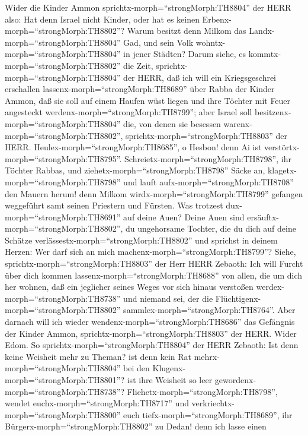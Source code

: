  Wider die Kinder Ammon
sprichtx-morph=``strongMorph:TH8804'' der HERR also: Hat denn Israel
nicht Kinder, oder hat es keinen Erbenx-morph=``strongMorph:TH8802''?
Warum besitzt denn Milkom das Landx-morph=``strongMorph:TH8804'' Gad,
und sein Volk wohntx-morph=``strongMorph:TH8804'' in jener Städten?
 Darum siehe, es kommtx-morph=``strongMorph:TH8802'' die
Zeit, sprichtx-morph=``strongMorph:TH8804'' der HERR, daß ich will ein
Kriegsgeschrei erschallen lassenx-morph=``strongMorph:TH8689'' über
Rabba der Kinder Ammon, daß sie soll auf einem Haufen wüst liegen und
ihre Töchter mit Feuer angesteckt werdenx-morph=``strongMorph:TH8799'';
aber Israel soll besitzenx-morph=``strongMorph:TH8804'' die, von denen
sie besessen warenx-morph=``strongMorph:TH8802'',
sprichtx-morph=``strongMorph:TH8803'' der HERR. 
Heulex-morph=``strongMorph:TH8685'', o Hesbon! denn Ai ist
verstörtx-morph=``strongMorph:TH8795''.
Schreietx-morph=``strongMorph:TH8798'', ihr Töchter Rabbas, und
ziehetx-morph=``strongMorph:TH8798'' Säcke an,
klagetx-morph=``strongMorph:TH8798'' und lauft
aufx-morph=``strongMorph:TH8708'' den Mauern herum! denn Milkom
wirdx-morph=``strongMorph:TH8799'' gefangen weggeführt samt seinen
Priestern und Fürsten.  Was trotzest
dux-morph=``strongMorph:TH8691'' auf deine Auen? Deine Auen sind
ersäuftx-morph=``strongMorph:TH8802'', du ungehorsame Tochter, die du
dich auf deine Schätze verlässestx-morph=``strongMorph:TH8802'' und
sprichst in deinem Herzen: Wer darf sich an mich
machenx-morph=``strongMorph:TH8799''?  Siehe,
sprichtx-morph=``strongMorph:TH8803'' der Herr HERR Zebaoth: Ich will
Furcht über dich kommen lassenx-morph=``strongMorph:TH8688'' von allen,
die um dich her wohnen, daß ein jeglicher seines Weges vor sich hinaus
verstoßen werdex-morph=``strongMorph:TH8738'' und niemand sei, der die
Flüchtigenx-morph=``strongMorph:TH8802''
sammlex-morph=``strongMorph:TH8764''.  Aber darnach will ich
wieder wendenx-morph=``strongMorph:TH8686'' das Gefängnis der Kinder
Ammon, sprichtx-morph=``strongMorph:TH8803'' der HERR. 
Wider Edom. So sprichtx-morph=``strongMorph:TH8804'' der HERR Zebaoth:
Ist denn keine Weisheit mehr zu Theman? ist denn kein Rat
mehrx-morph=``strongMorph:TH8804'' bei den
Klugenx-morph=``strongMorph:TH8801''? ist ihre Weisheit so leer
gewordenx-morph=``strongMorph:TH8738''? 
Fliehetx-morph=``strongMorph:TH8798'', wendet
euchx-morph=``strongMorph:TH8717'' und
verkriechtx-morph=``strongMorph:TH8800'' euch
tiefx-morph=``strongMorph:TH8689'', ihr
Bürgerx-morph=``strongMorph:TH8802'' zu Dedan! denn ich lasse einen
